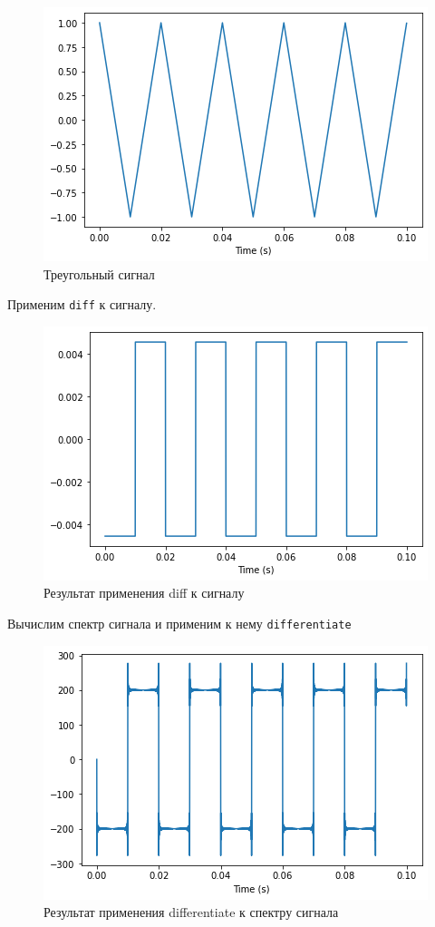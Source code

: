 \documentclass[a4paper, 14pt]{extarticle}
\begin{document}
    \begin{figure}[H]
        \centering
        \includegraphics[width=0.8\linewidth]{triangle_signal}
        \caption{Треугольный сигнал}
        \label{fig:triangle_signal}
    \end{figure}

    Применим \texttt{diff} к сигналу.

    \begin{figure}[H]
        \centering
        \includegraphics[width=0.8\linewidth]{triangle_diff}
        \caption{Результат применения diff к сигналу}
        \label{fig:triangle_diff}
    \end{figure}

    Вычислим спектр сигнала и применим к нему \texttt{differentiate}

    \begin{figure}[H]
        \centering
        \includegraphics[width=0.8\linewidth]{triangle_differentiate}
        \caption{Результат применения differentiate к спектру сигнала}
        \label{fig:triangle_differentiate}
    \end{figure}
\end{document}
